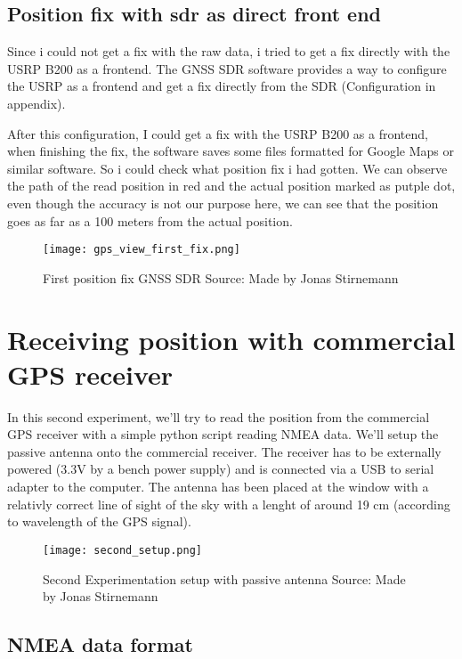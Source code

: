 \subsection{Position fix with sdr as direct front end}

Since i could not get a fix with the raw data, i tried to get a fix directly with the USRP B200 as a frontend. The GNSS SDR software provides a way to configure the USRP as a frontend and get a fix directly from the SDR (Configuration in appendix).

After this configuration, I could get a fix with the USRP B200 as a frontend, when finishing the fix, the software saves some files formatted for Google Maps or similar software. So i could check what position fix i had gotten. We can observe the path of the read position in red and the actual position marked as putple dot, even though the accuracy is not our purpose here, we can see that the position goes as far as a 100 meters from the actual position.

\begin{figure}[H]
	\centering
	\texttt{[image: gps\_view\_first\_fix.png]}
	\caption[First position fix GNSS SDR]{First position fix GNSS SDR Source: Made by Jonas Stirnemann}
	\label{fig:first_fix}
\end{figure}


\section{Receiving position with commercial GPS receiver}

In this second experiment, we'll try to read the position from the commercial GPS receiver with a simple python script reading NMEA data. We'll setup the passive antenna onto the commercial receiver. The receiver has to be externally powered (3.3V by a bench power supply) and is connected via a USB to serial adapter to the computer. The antenna has been placed at the window with a relativly correct line of sight of the sky with a lenght of around 19 cm (according to wavelength of the GPS signal).

\begin{figure}[H]
	\centering
	\texttt{[image: second\_setup.png]}
	\caption[Second Experimentation setup]{Second Experimentation setup with passive antenna Source: Made by Jonas Stirnemann}
	\label{fig:second_setup}
\end{figure}

\subsection{NMEA data format}

